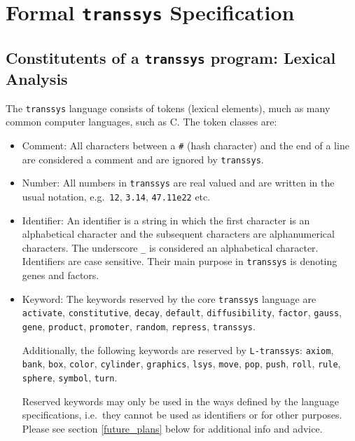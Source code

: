 \documentclass[12pt]{article}
\newcommand{\transsys}{\texttt{transsys}}
\newcommand{\ltranssys}{\texttt{L-}\transsys}
\begin{document}
\section{Formal \transsys{} Specification}

\subsection{Constitutents of a \transsys{} program: Lexical Analysis}

The \transsys{} language consists of tokens (lexical elements), much
as many common computer languages, such as C. The token classes are:

\begin{itemize}

\item Comment: All characters between a \verb|#| (hash character) and
  the end of a line are considered a comment and are ignored by
  \transsys{}.

\item Number: All numbers in \transsys{} are real valued and are
  written in the usual notation, e.g.\ \verb|12|, \verb|3.14|,
  \verb|47.11e22| etc.
  
\item Identifier: An identifier is a string in which the first
  character is an alphabetical character and the subsequent characters
  are alphanumerical characters. The underscore \verb|_| is considered
  an alphabetical character. Identifiers are case sensitive. Their
  main purpose in \transsys{} is denoting genes and factors.
  
\item Keyword: The keywords reserved by the core \transsys{} language
  are \verb|activate|, \verb|constitutive|, \verb|decay|, \verb|default|,
  \verb|diffusibility|, \verb|factor|, \verb|gauss|, \verb|gene|,
  \verb|product|, \verb|promoter|, \verb|random|, \verb|repress|,
  \verb|transsys|.
  
  Additionally, the following keywords are reserved by \ltranssys{}:
  \verb|axiom|, \verb|bank|, \verb|box|, \verb|color|, \verb|cylinder|,
  \verb|graphics|, \verb|lsys|, \verb|move|, \verb|pop|, \verb|push|,
  \verb|roll|, \verb|rule|, \verb|sphere|, \verb|symbol|, \verb|turn|.

  Reserved keywords may only be used in the ways defined by the
  language specifications, i.e.\ they cannot be used as identifiers or
  for other purposes. Please see section \ref{future_plans} below for
  additional info and advice.


\end{itemize}
\end{document}
